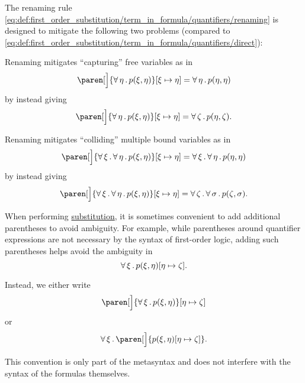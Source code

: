 \begin{remark}\label{rem:first_order_substitution_renaming_justification}
  The renaming rule \eqref{eq:def:first_order_substitution/term_in_formula/quantifiers/renaming} is designed to mitigate the following two problems (compared to \eqref{eq:def:first_order_substitution/term_in_formula/quantifiers/direct}):

  \begin{remenum}
     Renaming mitigates \enquote{capturing} free variables as in
    \begin{equation*}
      \paren[\Big]{ \qforall{\eta} p(\xi, \eta) }[\xi \mapsto \eta] = \qforall{\eta} p(\eta, \eta)
    \end{equation*}
    by instead giving
    \begin{equation*}
      \paren[\Big]{ \qforall{\eta} p(\xi, \eta) }[\xi \mapsto \eta] = \qforall{\zeta} p(\eta, \zeta).
    \end{equation*}

     Renaming mitigates \enquote{colliding} multiple bound variables as in
    \begin{equation*}
      \paren[\Big]{ \qforall{\xi} \qforall{\eta} p(\xi, \eta) }[\xi \mapsto \eta] = \qforall{\xi} \qforall{\eta} p(\eta, \eta)
    \end{equation*}
    by instead giving
    \begin{equation*}
      \paren[\Big]{ \qforall{\xi} \qforall{\eta} p(\xi, \eta) }[\xi \mapsto \eta] = \qforall{\zeta} \qforall{\sigma} p(\zeta, \sigma).
    \end{equation*}
  \end{remenum}
\end{remark}

\begin{remark}\label{rem:first_order_substitution_parentheses}
  When performing \hyperref[def:propositional_substitution]{substitution}, it is sometimes convenient to add additional parentheses to avoid ambiguity. For example, while parentheses around quantifier expressions are not necessary by the syntax of first-order logic, adding such parentheses helps avoid the ambiguity in
  \begin{equation*}
    \forall \, \xi \, . \, p(\xi, \eta) [\eta \mapsto \zeta].
  \end{equation*}

  Instead, we either write
  \begin{equation*}
    \paren[\Big]{ \qforall{\xi} p(\xi, \eta) } [\eta \mapsto \zeta]
  \end{equation*}
  or
  \begin{equation*}
    \qforall{\xi} \paren[\Big]{ p(\xi, \eta)[\eta \mapsto \zeta] }.
  \end{equation*}

  This convention is only part of the metasyntax and does not interfere with the syntax of the formulas themselves.
\end{remark}

